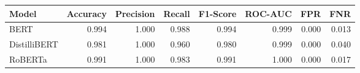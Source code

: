 \begin{tabular}{|l||r|r|r|r|r|r|r|}
\toprule
Model & \textbf{Accuracy} & \textbf{Precision} & Recall & \textbf{F1-Score} & \textbf{ROC-AUC} & \textbf{FPR} & FNR \\
\midrule \midrule
BERT & 0.994 & 1.000 & 0.988 & 0.994 & 0.999 & 0.000 & 0.013 \\
DistilliBERT & 0.981 & 1.000 & 0.960 & 0.980 & 0.999 & 0.000 & 0.040 \\
RoBERTa & 0.991 & 1.000 & 0.983 & 0.991 & 1.000 & 0.000 & 0.017 \\
\bottomrule
\end{tabular}
